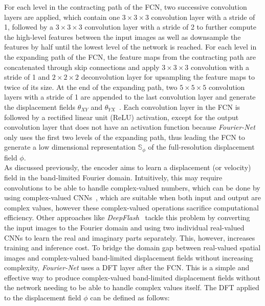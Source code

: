 \documentclass[english,version-2022-01]{uzl-thesis} %
\begin{document}
For each level in the contracting path of the FCN, two successive convolution layers are applied, which contain one $3 \times 3 \times 3$ convolution layer with a stride of 1, followed by a $3 \times 3 \times 3$ convolution layer with a stride of 2 to further compute the high-level features between the input images as well as downsample the features by half until the lowest level of the network is reached. For each level in the expanding path of the FCN, the feature maps from the contracting path are concatenated through skip connections and apply $3 \times 3 \times 3$ convolution with a stride of 1 and $2 \times 2 \times 2$ deconvolution layer for upsampling the feature maps to twice of its size. At the end of the expanding path, two $5 \times 5 \times 5$ convolution layers with a stride of 1 are appended to the last convolution layer and generate the displacement fields $\theta_{XY}$ and $\theta_{YX}$~\cite{SYM-Net}. Each convolution layer in the FCN is followed by a rectified linear unit (ReLU) activation, except for the output convolution layer that does not have an activation function because \emph{Fourier-Net} only uses the first two levels of the expanding path, thus leading the FCN to generate a low dimensional representation $\mathbb{S}_\phi$ of the full-resolution displacement field $\phi$.\\
As discussed previously, the encoder aims to learn a displacement (or velocity) field in the band-limited Fourier domain. Intuitively, this may require convolutions to be able to handle complex-valued numbers, which can be done by using complex-valued CNNs~\cite{Trabelsi2017}, which are suitable when both input and output are complex values, however these complex-valued operations sacrifice computational efficiency. Other approaches like \emph{DeepFlash}~\cite{DeepFlash} tackle this problem by converting the input images to the Fourier domain and using two individual real-valued CNNs to learn the real and imaginary parts separately. This, however, increases training and inference cost. To bridge the domain gap between real-valued spatial images and complex-valued band-limited displacement fields without increasing complexity, \emph{Fourier-Net} uses a DFT layer after the FCN. This is a simple and effective way to produce complex-valued band-limited displacement fields without the network needing to be able to handle complex values itself. The DFT applied to the displacement field $\phi$ can be defined as follows:
\end{document}
